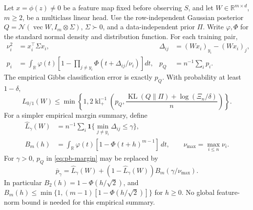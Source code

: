 \begin{proposition}
\label{prop:pb-margin}
Let $x=\phi(z)\ne0$ be a feature map fixed before observing $S$, and
let $W\in\mathbb R^{m\times d}$, $m\ge2$, be a multiclass linear head.
Use the row-independent Gaussian posterior
$Q=\mathcal N(\operatorname{vec}W,I_m\otimes\Sigma)$, $\Sigma\succ0$,
and a data-independent prior $\Pi$. Write $\varphi,\Phi$ for the
standard normal density and distribution function. For each training pair,
\begin{align}
 \nu_i^2&=x_i^\top\Sigma x_i,&
 \Delta_{ij}&=(Wx_i)_{y_i}-(Wx_i)_j,\\
 p_i&=\int_{\mathbb R}\varphi(t)
       \left[1-\prod_{j\ne y_i}\Phi(t+\Delta_{ij}/\nu_i)\right]dt,&
 p_Q&=n^{-1}\sum_i p_i.
\end{align}
The empirical Gibbs classification error is exactly $p_Q$. With
probability at least $1-\delta$,
\begin{equation}
 L_{0/1}(W)\le\min\left\{1,
 2\operatorname{kl}^{-1}_+\left(p_Q,
      \frac{\operatorname{KL}(Q\|\Pi)+\log(\Xi_n/\delta)}n\right)\right\}.
 \label{eq:pb-margin}
\end{equation}
For a simpler empirical margin summary, define
\begin{align}
 \widehat L_\gamma(W)&=n^{-1}\sum_i
                  \mathbf1\{\min_{j\ne y_i}\Delta_{ij}\le\gamma\},\\
 B_m(h)&=\int_{\mathbb R}\varphi(t)[1-\Phi(t+h)^{m-1}]\,dt,
 \qquad\nu_{\max}=\max_{i\le n}\nu_i.
\end{align}
For $\gamma>0$, $p_Q$ in \eqref{eq:pb-margin} may be replaced by
\begin{equation}
 \overline p_\gamma=\widehat L_\gamma(W)
       +(1-\widehat L_\gamma(W))B_m(\gamma/\nu_{\max}).
\end{equation}
In particular $B_2(h)=1-\Phi(h/\sqrt2)$, and
$B_m(h)\le\min\{1,(m-1)[1-\Phi(h/\sqrt2)]\}$ for $h\ge0$.
No global feature-norm bound is needed for this empirical summary.
\end{proposition}

